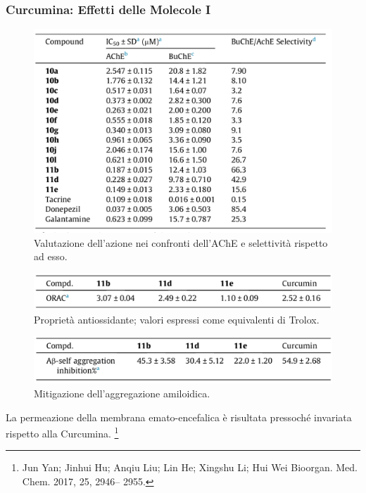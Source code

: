 \documentclass[9pt]{beamer}
\newcommand\blfootnote[1]{%
	\begingroup
	\renewcommand\thefootnote{}\footnote{#1}%
	\addtocounter{footnote}{-1}%
	\endgroup
}
\begin{document}
\begin{frame}
	\frametitle{Curcumina: Effetti delle Molecole I}

	\begin{figure}
		\includegraphics[scale=0.6]{immagini/tabellacomposti_curcdone.png}
		{\caption*{\footnotesize{Valutazione dell’azione nei confronti dell’AChE e selettività rispetto ad esso.}}}
	\end{figure}

	\begin{figure}
		\includegraphics[scale=0.6]{immagini/roi_curcdone.png}
		{\caption*{\footnotesize{Proprietà antiossidante; valori espressi come equivalenti di Trolox.}}}
	\end{figure}

	\begin{figure}
		\includegraphics[scale=0.6]{immagini/selfab_curcdone.png}
		{\caption*{\footnotesize{Mitigazione dell'aggregazione amiloidica.}}}
	\end{figure}

	\small{ La permeazione della membrana emato-encefalica è risultata pressoché invariata rispetto alla Curcumina.} \medskip
	\blfootnote{Jun Yan; Jinhui Hu; Anqiu Liu; Lin He; Xingshu Li; Hui Wei Bioorgan. Med. Chem. 2017, 25, 2946–
		2955.}
\end{frame}
\end{document}
